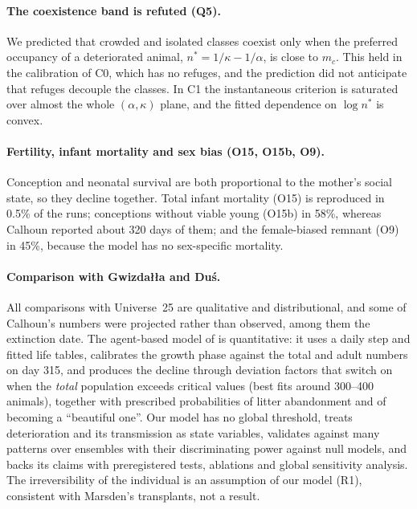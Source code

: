 \paragraph{The coexistence band is refuted (Q5).}
We predicted that crowded and isolated classes coexist only when the preferred occupancy of a deteriorated animal,
$n^*=1/\kappa-1/\alpha$, is close to $m_c$. This held in the calibration of \textsf{C0}, which has no refuges, and the
prediction did not anticipate that refuges decouple the classes. In \textsf{C1} the instantaneous criterion is
saturated over almost the whole $(\alpha,\kappa)$ plane, and the fitted dependence on $\log n^*$ is convex.

\paragraph{Fertility, infant mortality and sex bias (O15, O15b, O9).}
Conception and neonatal survival are both proportional to the mother's social state, so they decline together. Total
infant mortality (O15) is reproduced in 0.5\% of the runs; conceptions without viable young (O15b) in 58\%, whereas
Calhoun reported about 320 days of them; and the female-biased remnant (O9) in 45\%, because the model has no
sex-specific mortality.

\paragraph{Comparison with Gwizdałła and Duś.}
All comparisons with Universe~25 are qualitative and distributional, and some of Calhoun's numbers were projected
rather than observed, among them the extinction date. The agent-based model of \cite{GwizdallaDus2026} is
quantitative: it uses a daily step and fitted life tables, calibrates the growth phase against the total and adult
numbers on day 315, and produces the decline through deviation factors that switch on when the \emph{total}
population exceeds critical values (best fits around 300--400 animals), together with prescribed probabilities of
litter abandonment and of becoming a ``beautiful one''. Our model has no global threshold, treats deterioration and
its transmission as state variables, validates against many patterns over ensembles with their discriminating power
against null models, and backs its claims with preregistered tests, ablations and global sensitivity analysis. The
irreversibility of the individual is an assumption of our model (R1), consistent with Marsden's transplants, not a
result.
